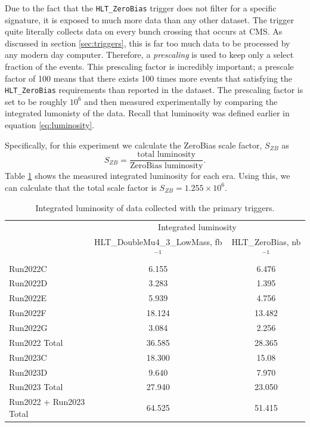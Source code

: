 Due to the fact that the \texttt{HLT\_ZeroBias} trigger does not filter for a specific signature, it is exposed to much more data than any other dataset. The trigger quite literally collects data on every bunch crossing that occurs at CMS. As discussed in section \ref{sec:triggers}, this is far too much data to be processed by any modern day computer. Therefore, a \textit{prescaling} is used to keep only a select fraction of the events. This prescaling factor is incredibly important; a prescale factor of 100 means that there exists 100 times more events that satisfying the \texttt{HLT\_ZeroBias} requirements than reported in the dataset. The prescaling factor is set to be roughly $10^{6}$ and then measured experimentally by comparing the integrated lumonisty of the data. Recall that luminosity was defined earlier in equation \ref{eq:luminosity}. 

Specifically, for this experiment we calculate the ZeroBias scale factor, $S_{ZB}$ as 
\begin{equation}
    S_{ZB} = \frac{\text{total luminosity}}{\text{ZeroBias luminosity}}.
\end{equation}
Table \ref{tab:int_lumi_final} shows the measured integrated luminosity for each era. Using this, we can calculate that the total scale factor is $S_{ZB} = 1.255 \times 10^6$.

\begin{table}[htbp]
    \centering
    \begin{tabular}{|l|c|c|}
        \hline
         & \multicolumn{2}{c|}{Integrated luminosity} \\
        \cline{2-3}
         & HLT\_DoubleMu4\_3\_LowMass, fb$^{-1}$ & HLT\_ZeroBias, nb$^{-1}$ \\
        \hline
        Run2022C      & 6.155  & 6.476 \\
        Run2022D      & 3.283  & 1.395 \\
        Run2022E      & 5.939  & 4.756 \\
        Run2022F      & 18.124 & 13.482 \\
        Run2022G      & 3.084  & 2.256 \\
        \hline
        Run2022 Total & 36.585 & 28.365 \\
        \hline
        Run2023C      & 18.300 & 15.08 \\
        Run2023D      & 9.640  & 7.970 \\
        \hline
        Run2023 Total & 27.940 & 23.050 \\
        \hline
        Run2022 + Run2023 Total & 64.525 & 51.415 \\
        \hline
    \end{tabular}
    \caption{Integrated luminosity of data collected with the primary triggers.}
    \label{tab:int_lumi_final}
\end{table}

